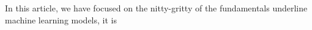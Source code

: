 In this article, we have focused on the nitty-gritty of the fundamentals underline machine learning models, it is 
